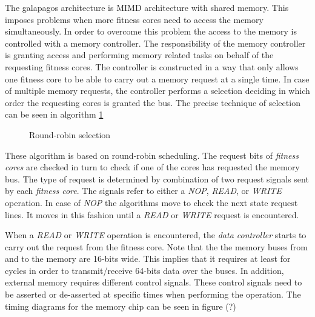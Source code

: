 The galapagos architecture is MIMD architecture with shared memory. This imposes problems when more fitness cores need to access the memory simultaneously. In order to overcome this problem the access to the memory is controlled with a memory controller. The responsibility of the memory controller is granting access and performing memory related tasks on behalf of the requesting fitness cores. The controller is constructed in a way that only allows one fitness core to be able to carry out a memory request at a single time. In case of multiple memory requests, the controller performs a selection deciding in which order the requesting cores is granted the bus. The precise technique of selection can be seen in algorithm \ref{algorithm:round-robin-selection}

\begin{figure}[H]
\begin{algorithm}[H]
\SetAlgoLined
\DontPrintSemicolon
{}
\caption{Round-robin selection}
\label{algorithm:round-robin-selection}
\end{algorithm}
\end{figure}


These algorithm is based on round-robin scheduling. The request bits of \emph{fitness cores} are checked in turn to check if one of the cores has requested the memory bus. The type of request is determined by combination of two request signals sent by each \emph{fitness core}. The signals refer to either a \emph{NOP}, \emph{READ}, or \emph{WRITE} operation. In case of \emph{NOP} the algorithms move to check the next state request lines. It moves in this fashion until a \emph{READ} or \emph{WRITE} request is encountered. 

When a \emph{READ} or \emph{WRITE} operation is encountered, the \emph{data controller} starts to carry out the request from the fitness core. Note that the the memory buses from and to the memory are 16-bits wide. This implies that  it requires at least for cycles in order to transmit/receive 64-bits data over the buses. In addition, external memory requires different control signals. These control signals need to be asserted or de-asserted at specific times when performing the operation. The timing diagrams for the memory chip can be seen in figure (?) 

